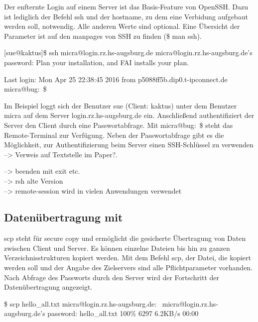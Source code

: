 \documentclass[ngerman,pdf]{wkcms}    %
\begin{document}
Der enfternte Login auf einem Server ist das Basis-Feature von OpenSSH.
Dazu ist lediglich der Befehl \IT ssh und der \IT hostname, zu dem eine Verbidung aufgebaut werden soll, notwendig. Alle anderen Werte sind optional.
Eine Übersicht der Parameter ist auf den manpages von SSH zu finden
(\$ man ssh).

\begin{program}

[sue@kaktus]\$ ssh micra@login.rz.hs-augsburg.de
micra@login.rz.hs-augsburg.de's password:
Plan your installation, and FAI installs your plan.

Last login: Mon Apr 25 22:38:45 2016
from p5088ff5b.dip0.t-ipconnect.de
micra@bug:~\$

\end{program}

Im Beispiel loggt sich der Benutzer \IT sue (Client: \IT kaktus) unter dem Benutzer \IT micra auf dem Server \IT login.rz.hs-augsburg.de ein. Anschließend authentifiziert der Server den Client durch eine Passwortabfrage. Mit \IT micra@bug:~\$ steht das Remote-Terminal zur Verfügung. Neben der Passwortabfrage gibt es die Möglichkeit, zur Authentifizierung beim Server einen SSH-Schlüssel zu verwenden --> Verweis auf Textstelle im Paper?.

--> beenden mit exit etc.\\
--> rsh alte Version\\
--> remote-session wird in vielen Anwendungen verwendet

\subsection{Datenübertragung mit }

\IT scp steht für \IT secure \IT copy und ermöglicht die gesicherte Übertragung von Daten zwischen Client und Server. Es können einzelne Dateien bis hin zu ganzen Verzeichnisstrukturen kopiert werden. \cite[S. 80]{openssh_book} Mit dem Befehl \IT scp, der Datei, die kopiert werden soll und der Angabe des Zielservers sind alle Pflichtparameter vorhanden. Nach Abfrage des Passworts durch den Server wird der Fortschritt der Datenübertragung angezeigt.

\begin{program}
\$ scp hello\_all.txt
micra@login.rz.hs-augsburg.de:~
micra@login.rz.hs-augsburg.de's password:
hello\_all.txt        100\% 6297     6.2KB/s   00:00
\end{program}
\end{document}
